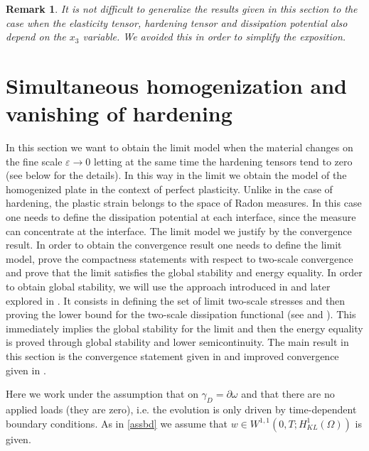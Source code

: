 \documentclass[reqno,10pt]{amsart}
\numberwithin{equation}{section}
\newtheorem{remark}[theorem]{Remark}
\theoremstyle{remark}
\newcommand{\Dir}{D}
\newcommand{\eps}{\varepsilon}
\begin{document}
\begin{remark} 
It is not difficult to generalize the results given in this section to the case when the elasticity tensor, hardening tensor and dissipation potential also depend on the $x_3$ variable. 
We avoided this in order to simplify the exposition.
\end{remark} 

\section{Simultaneous homogenization and vanishing of hardening} \label{limit of quasistatic evolutions - eps to 0}

In this section we want to obtain the limit model when the material changes on the fine scale $\eps \to 0$ letting at the same time the hardening tensors tend to zero (see below for the details). 
In this way in the limit we obtain the model of the homogenized plate in the context of perfect plasticity. 
Unlike in the case of hardening, the plastic strain belongs to the space of Radon measures. 
In this case one needs to define the dissipation potential at each interface, since the measure can concentrate at the interface. 
The limit model we justify by the convergence result. 
In order to obtain the convergence result one needs to define the limit model, prove the compactness statements with respect to two-scale convergence and prove that the limit satisfies the global stability and energy equality. 
In order to obtain global stability, we will use the approach introduced in \cite{Francfort.Giacomini.2014} and later explored in \cite{Buzancic.Davoli.Velcic.2024.1st,Buzancic.Davoli.Velcic.2024.2nd}. 
It consists in defining the set of limit two-scale stresses and then proving the lower bound for the two-scale dissipation functional (see  and ). 
This immediately implies the global stability for the limit and then the energy equality is proved through global stability and lower semicontinuity. 
The main result in this section is the convergence statement given in  and improved convergence given in . 

Here we work under the assumption that on $\gamma_\Dir=\partial \omega$ and that there are no applied loads (they are zero), i.e. the evolution is only driven by time-dependent boundary conditions.
As in \eqref{assbd} we assume that $w \in W^{1,1}(0,T;H^1_{KL}(\Omega))$ is given. 
\end{document}
